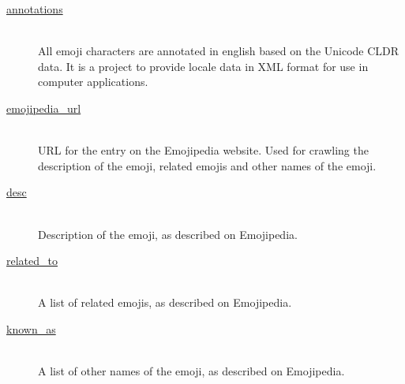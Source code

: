 \documentclass[a4paper]{article}
\begin{document}
\begin{description}
    \item[\url{annotations}] \hfill \\
        All emoji characters are annotated in english based on the Unicode CLDR data. It is a project to provide locale data in XML format for use in computer applications.
    \item[\url{emojipedia_url}] \hfill \\
        URL for the entry on the Emojipedia website. Used for crawling the description of the emoji, related emojis and other names of the emoji.
    \item[\url{desc}] \hfill \\
        Description of the emoji, as described on Emojipedia.
    \item[\url{related_to}] \hfill \\
        A list of related emojis, as described on Emojipedia.
    \item[\url{known_as}] \hfill \\
        A list of other names of the emoji, as described on Emojipedia.

\end{description}

\end{document}
